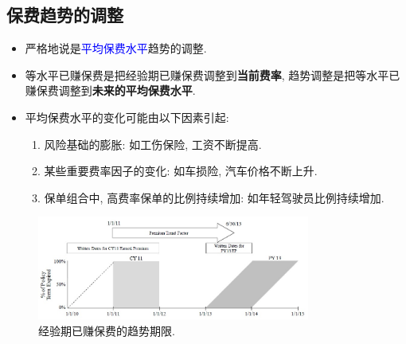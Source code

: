 \documentclass[professionalfont]{beamer}
\newcommand{\green}[1]{\textbf{#1}}
\newcommand{\blue}[1]{\textcolor{blue}{#1}}
\begin{document}
\subsection{保费趋势的调整}
\begin{frame}
	\begin{itemize}
		\item 严格地说是\blue{平均保费水平}趋势的调整. 
		\item 等水平已赚保费是把经验期已赚保费调整到\green{当前费率}, 趋势调整是把等水平已赚保费调整到\green{未来的平均保费水平}.
		\item 平均保费水平的变化可能由以下因素引起:
		\begin{enumerate}
			\item 风险基础的膨胀: 如工伤保险, 工资不断提高.
			\item 某些重要费率因子的变化: 如车损险, 汽车价格不断上升.
			\item 保单组合中, 高费率保单的比例持续增加: 如年轻驾驶员比例持续增加.
		\end{enumerate}
	\end{itemize}
\end{frame}
\begin{frame}
	\begin{figure}
\includegraphics[width=0.8\textwidth]{Plots/Premium_trend_1.jpg}
\caption{经验期已赚保费的趋势期限.}
	\end{figure}
\end{frame}
\end{document}
